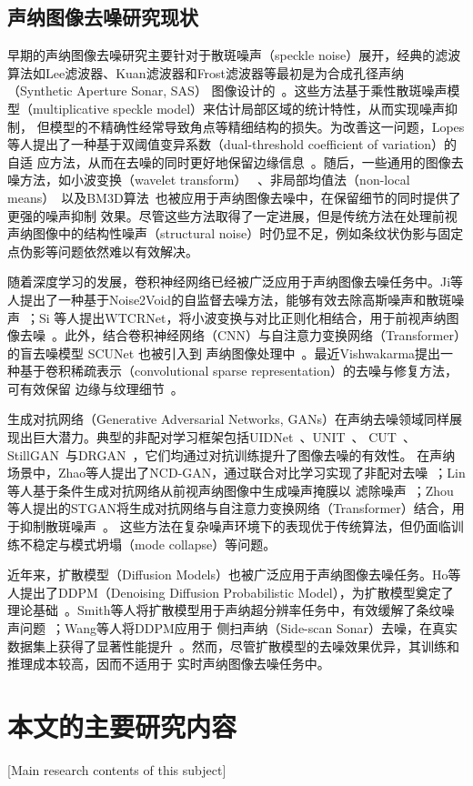 \subsection{声纳图像去噪研究现状}

早期的声纳图像去噪研究主要针对于散斑噪声（speckle noise）展开，经典的滤波算法如Lee滤波器、Kuan滤波器和Frost滤波器等最初是为合成孔径声纳（Synthetic Aperture Sonar, SAS）
图像设计的~\cite{mascarenhas1997overview}。这些方法基于乘性散斑噪声模型（multiplicative speckle model）来估计局部区域的统计特性，从而实现噪声抑制，
但模型的不精确性经常导致角点等精细结构的损失。为改善这一问题，Lopes等人提出了一种基于双阈值变异系数（dual-threshold coefficient of variation）的自适
应方法，从而在去噪的同时更好地保留边缘信息~\cite{lopes2002adaptive}。随后，一些通用的图像去噪方法，如小波变换（wavelet transform）~\cite{chang2000adaptive}
、非局部均值法（non-local means）~\cite{buades2005non}以及BM3D算法~\cite{dabov2007image}也被应用于声纳图像去噪中，在保留细节的同时提供了更强的噪声抑制
效果。尽管这些方法取得了一定进展，但是传统方法在处理前视声纳图像中的结构性噪声（structural noise）时仍显不足，例如条纹状伪影与固定点伪影等问题依然难以有效解决。

随着深度学习的发展，卷积神经网络已经被广泛应用于声纳图像去噪任务中。Ji等人提出了一种基于Noise2Void的自监督去噪方法，能够有效去除高斯噪声和散斑噪声~\cite{ji2025sonar}；Si
等人提出WTCRNet，将小波变换与对比正则化相结合，用于前视声纳图像去噪~\cite{si2024wtcrnet}。此外，结合卷积神经网络（CNN）与自注意力变换网络（Transformer）的盲去噪模型 SCUNet 也被引入到
声纳图像处理中~\cite{zhang2023practical}。最近Vishwakarma提出一种基于卷积稀疏表示（convolutional sparse representation）的去噪与修复方法，可有效保留
边缘与纹理细节~\cite{vishwakarma2023denoising}。

生成对抗网络（Generative Adversarial Networks, GANs）在声纳去噪领域同样展现出巨大潜力。典型的非配对学习框架包括UIDNet~\cite{hong2020end}、UNIT~\cite{liu2017unsupervised}、
CUT~\cite{park2020contrastive}、StillGAN~\cite{ma2021structure}与DRGAN~\cite{huang2020noise}，它们均通过对抗训练提升了图像去噪的有效性。
在声纳场景中，Zhao等人提出了NCD-GAN，通过联合对比学习实现了非配对去噪~\cite{zhao2023unpaired}；Lin等人基于条件生成对抗网络从前视声纳图像中生成噪声掩膜以
滤除噪声~\cite{lin2023conditional}；Zhou 等人提出的STGAN将生成对抗网络与自注意力变换网络（Transformer）结合，用于抑制散斑噪声~\cite{zhou2023stgan}。
这些方法在复杂噪声环境下的表现优于传统算法，但仍面临训练不稳定与模式坍塌（mode collapse）等问题。

近年来，扩散模型（Diffusion Models）也被广泛应用于声纳图像去噪任务。Ho等人提出了DDPM（Denoising Diffusion Probabilistic Model），为扩散模型奠定了
理论基础~\cite{ho2020denoising}。Smith等人将扩散模型用于声纳超分辨率任务中，有效缓解了条纹噪声问题~\cite{bryan2025diffusion}；Wang等人将DDPM应用于
侧扫声纳（Side-scan Sonar）去噪，在真实数据集上获得了显著性能提升~\cite{yang2023side}。然而，尽管扩散模型的去噪效果优异，其训练和推理成本较高，因而不适用于
实时声纳图像去噪任务中。

\section{本文的主要研究内容}[Main research contents of this subject]




